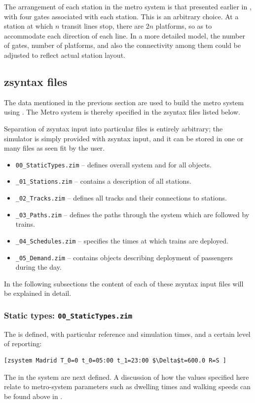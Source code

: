The arrangement of each station in the metro system is that presented
earlier in , with four gates associated with each
station. This is an arbitrary choice. At a station at which $n$ transit
lines stop, there are $2n$ platforms, so as to accommodate each
direction of each line.  In a more detailed model, the number of
gates, number of platforms, and also the connectivity among them could
be adjusted to reflect actual station layout.

\subsection{zsyntax files}
\label{madseczsyn}

The data mentioned in the previous section are used to build the metro system using .
The Metro system is thereby specified in the zsyntax files listed below.

Separation of zsyntax input into particular files is entirely arbitrary;
the simulator is simply provided with zsyntax input, and it can be stored in one or
many files as seen fit by the user. 

\begin{itemize}
\item {\tt 00\_StaticTypes.zim} -- defines overall system and  for all objects.
\item {\tt \_01\_Stations.zim} -- contains a description of all stations.
\item {\tt \_02\_Tracks.zim} --  defines all tracks and their connections to stations. 
\item {\tt \_03\_Paths.zim} --  defines the paths through the system which are followed by trains.
\item {\tt \_04\_Schedules.zim} --  specifies the times at which trains are deployed.
\item {\tt \_05\_Demand.zim} -- contains  objects describing deployment of passengers during the day.
\end{itemize}

In the following subsections the content of each of these zsyntax input files will be explained in detail.

\subsubsection{Static types: {\tt 00\_StaticTypes.zim}}

The  is defined, with particular reference and simulation times, and a certain level of reporting:
\begin{lstlisting}[mathescape]
[zsystem Madrid T_0=0 t_0=05:00 t_1=23:00 $\Delta$t=600.0 R=S ]
\end{lstlisting}
The  in the system are next defined. A discussion of how
the values specified here relate to metro-system parameters such as
dwelling times and walking speeds can be found above in
.

